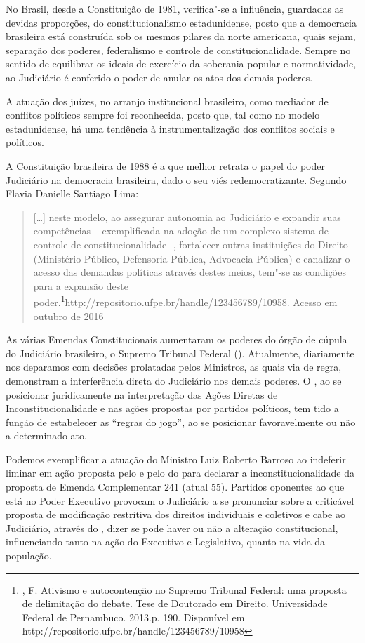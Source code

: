 No Brasil, desde a Constituição de 1981, verifica"-se a influência,
guardadas as devidas proporções, do constitucionalismo estadunidense,
posto que a democracia brasileira está construída sob os mesmos pilares
da norte americana, quais sejam, separação dos poderes, federalismo e
controle de constitucionalidade. Sempre no sentido de equilibrar os
ideais de exercício da soberania popular e normatividade, ao Judiciário
é conferido o poder de anular os atos dos demais poderes.

A atuação dos juízes, no arranjo institucional brasileiro, como mediador
de conflitos políticos sempre foi reconhecida, posto que, tal como no
modelo estadunidense, há uma tendência à instrumentalização dos
conflitos sociais e políticos.

A Constituição brasileira de 1988 é a que melhor retrata o papel do
poder Judiciário na democracia brasileira, dado o seu viés
redemocratizante. Segundo Flavia Danielle Santiago Lima:

\begin{quote}
{[}\ldots{}{]} neste modelo, ao assegurar autonomia ao Judiciário e expandir
suas competências -- exemplificada na adoção de um complexo sistema de
controle de constitucionalidade -, fortalecer outras instituições do
Direito (Ministério Público, Defensoria Pública, Advocacia Pública) e
canalizar o acesso das demandas políticas através destes meios, tem"-se
as condições para a expansão deste poder.\footnote{, F.
Ativismo e autocontenção no Supremo Tribunal Federal: uma
  proposta de delimitação do debate. Tese de Doutorado em
  Direito. Universidade Federal de Pernambuco. 2013.p. 190. Disponível
  em http://repositorio.ufpe.br/handle/123456789/10958}{{http://repositorio.ufpe.br/handle/123456789/10958}.
  Acesso em outubro de 2016}
\end{quote}

As várias Emendas Constitucionais aumentaram os poderes do órgão de
cúpula do Judiciário brasileiro, o Supremo Tribunal Federal ().
Atualmente, diariamente nos deparamos com decisões prolatadas pelos
Ministros, as quais via de regra, demonstram a interferência direta do
Judiciário nos demais poderes. O , ao se posicionar juridicamente na
interpretação das Ações Diretas de Inconstitucionalidade e nas ações
propostas por partidos políticos, tem tido a função de estabelecer as
``regras do jogo'', ao se posicionar favoravelmente ou não a determinado
ato.

Podemos exemplificar a atuação do Ministro Luiz Roberto Barroso ao
indeferir liminar em ação proposta pelo  e pelo do para declarar
a inconstitucionalidade da proposta de Emenda Complementar 241 (atual
 55). Partidos oponentes ao que está no Poder Executivo provocam o
Judiciário a se pronunciar sobre a criticável proposta de modificação
restritiva dos direitos individuais e coletivos e cabe ao Judiciário,
através do , dizer se pode haver ou não a alteração constitucional,
influenciando tanto na ação do Executivo e Legislativo, quanto na vida
da população.

